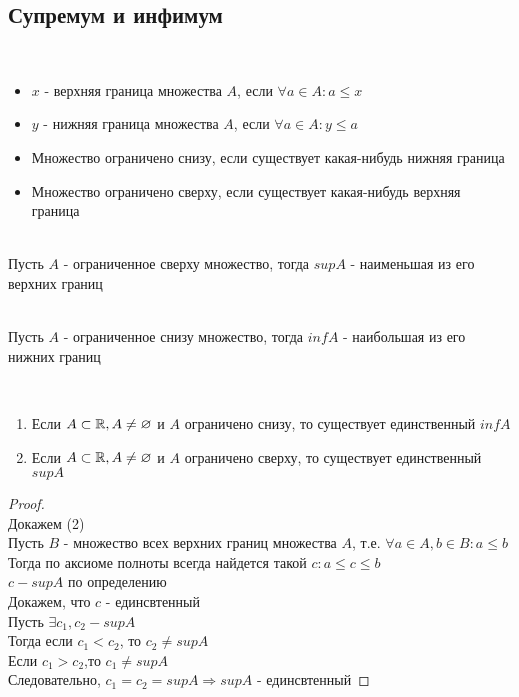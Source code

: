 \subsection{Супремум и инфимум}
\begin{conj}
    \quad \\
    \begin{itemize}
        \item[] $x$ - верхняя граница множества $A$, если $\forall a \in A: a \leqslant x$
        \item[] $y$ - нижняя граница множества $A$, если $\forall a \in A: y \leqslant a$ 
        \item[] Множество ограничено снизу, если существует какая-нибудь нижняя граница
        \item[] Множество ограничено сверху, если существует какая-нибудь верхняя граница
    \end{itemize}
\end{conj}
\begin{conj}
    \quad \\
    Пусть $A$ - ограниченное сверху множество, тогда $sup A$ - наименьшая из его верхних границ
\end{conj}
\begin{conj}
    \quad \\
    Пусть $A$ - ограниченное снизу множество, тогда $inf A$ - наибольшая из его нижних границ
\end{conj}
\begin{theorem-non}
    \quad \\
    \begin{enumerate}
        \item Если $A \subset \mathbb{R}, A \neq \varnothing $ и $ A $ ограничено снизу, то существует единственный $inf A$
        \item Если $A \subset \mathbb{R}, A \neq \varnothing $ и $ A $ ограничено сверху, то существует единственный $sup A$
    \end{enumerate}
\end{theorem-non}
\begin{proof}
    \quad \\
    Докажем (2) \\
    Пусть $B$ - множество всех верхних границ множества $A$, т.е. $\forall a \in A, b \in B: a \leqslant b$ \\
    Тогда по аксиоме полноты всегда найдется такой $c: a \leqslant c \leqslant b$ \\
    $c - sup A$ по определению \\
    Докажем, что $c$ - единсвтенный \\
    Пусть $\exists c_1, c_2 - sup A$ \\
    Тогда если $c_1 < c_2$, то $c_2 \neq sup A$ \\
    Если $c_1 > c_2$,то $c_1 \neq sup A$ \\
    Следовательно, $c_1 = c_2 = sup A \Longrightarrow sup A$ - единсвтенный  
\end{proof}
